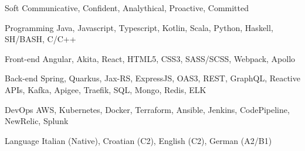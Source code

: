 


\begin{cvskills}

  \cvskill
    {Soft} %
    {Communicative, Confident, Analythical, Proactive, Committed} %

  \cvskill
    {Programming} %
    {Java, Javascript, Typescript, Kotlin, Scala, Python, Haskell, SH/BASH, C/C++} %

  \cvskill
    {Front-end} %
    {Angular, Akita, React, HTML5, CSS3, SASS/SCSS, Webpack, Apollo} %
    
  \cvskill
    {Back-end} %
    {Spring, Quarkus, Jax-RS, ExpressJS, OAS3, REST, GraphQL, Reactive APIs, Kafka, Apigee, Traefik, SQL, Mongo, Redis, ELK} %

  \cvskill
    {DevOps} %
    {AWS, Kubernetes, Docker, Terraform, Ansible, Jenkins, CodePipeline, NewRelic, Splunk} %

  \cvskill
    {Language} %
    {Italian (Native), Croatian (C2), English (C2), German (A2/B1)} %

\end{cvskills}
